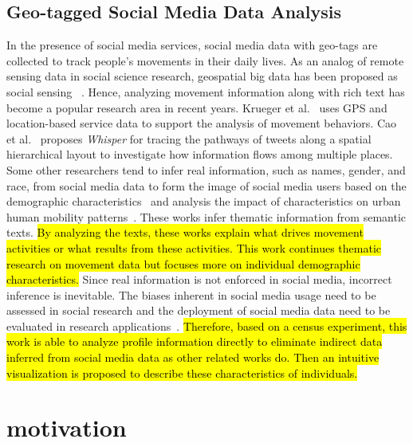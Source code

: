 \documentclass{ieeeaccess}
\begin{document}
\subsection{Geo-tagged Social Media Data Analysis}
In the presence of social media services, social media data with geo-tags are collected to track people's movements in their daily lives. As an analog of remote sensing data in social science research, geospatial big data has been proposed as social sensing ~\cite{liu2015social}. Hence, analyzing movement information along with rich text has become a popular research area in recent years. Krueger et al.~\cite{krueger2014visual} uses GPS and location-based service data to support the analysis of movement behaviors. Cao et al.~\cite{cao2012whisper} proposes \textit{Whisper} for tracing the pathways of tweets along a spatial hierarchical layout to investigate how information flows among multiple places. Some other researchers tend to infer real information, such as names, gender, and race, from social media data to form the image of social media users based on the demographic characteristics~\cite{peddinti2014internet} and analysis the impact of characteristics on urban human mobility patterns~\cite{luo2016explore}. These works infer thematic information from semantic texts. \hl{By analyzing the texts, these works explain what drives movement activities or what results from these activities. This work continues thematic research on movement data but focuses more on individual demographic characteristics.} Since real information is not enforced in social media, incorrect inference is inevitable. The biases inherent in social media usage need to be assessed in social research and the deployment of social media data need to be evaluated in research applications~\cite{Longley2015, Paul2016_twitter}. \hl{Therefore, based on a census experiment, this work is able to analyze profile information directly to eliminate indirect data inferred from social media data as other related works do. Then an intuitive visualization is proposed to describe these characteristics of individuals.}
\section{motivation}
\end{document}
